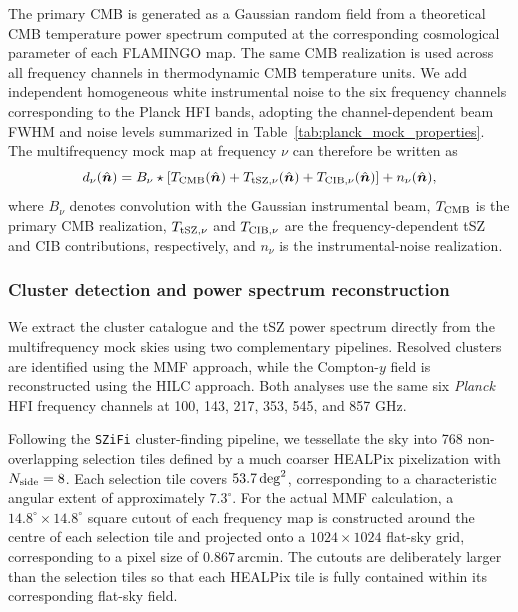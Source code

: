 \documentclass[aps,prd,twocolumn,superscriptaddress,nofootinbib,floatfix]{revtex4-2}
\begin{document}
The primary CMB is generated as a Gaussian random field from a theoretical CMB temperature power spectrum computed at the corresponding cosmological parameter of each FLAMINGO map. The same CMB realization is used across all frequency channels in thermodynamic CMB temperature units. We add independent homogeneous white instrumental noise to the six frequency channels corresponding to the Planck HFI bands, adopting the channel-dependent beam FWHM and noise levels summarized in Table~\ref{tab:planck_mock_properties}. The multifrequency mock map at frequency $\nu$ can therefore be written as
\begin{equation}
d_{\nu}(\hat{\bm n})
=
B_{\nu}\star
\left[
T_{\rm CMB}(\hat{\bm n})
+
T_{{\rm tSZ},\nu}(\hat{\bm n})
+
T_{{\rm CIB},\nu}(\hat{\bm n})
\right]
+
n_{\nu}(\hat{\bm n}),
\label{eq:multifrequency_mock_map}
\end{equation}
where $B_{\nu}$ denotes convolution with the Gaussian instrumental beam, $T_{\rm CMB}$ is the primary CMB realization, $T_{{\rm tSZ},\nu}$ and $T_{{\rm CIB},\nu}$ are the frequency-dependent tSZ and CIB contributions, respectively, and $n_{\nu}$ is the instrumental-noise realization. 

\subsubsection{Cluster detection and power spectrum reconstruction}

We extract the cluster catalogue and the tSZ power spectrum directly from the multifrequency mock skies using two complementary pipelines. Resolved clusters are identified using the MMF approach, while the Compton-$y$ field is reconstructed using the HILC approach. Both analyses use the same six \textit{Planck} HFI frequency channels at 100, 143, 217, 353, 545, and 857 GHz.

Following the \texttt{SZiFi} cluster-finding pipeline, we tessellate the sky into 768 non-overlapping selection tiles defined by a much coarser HEALPix pixelization with $N_{\rm side}=8$. Each selection tile covers $53.7\,{\rm deg}^2$, corresponding to a characteristic angular extent of approximately $7.3^\circ$. For the actual MMF calculation, a $14.8^\circ\times14.8^\circ$ square cutout of each frequency map is constructed around the centre of each selection tile and projected onto a $1024\times1024$ flat-sky grid, corresponding to a pixel size of $0.867\,\mathrm{arcmin}$. The cutouts are deliberately larger than the selection tiles so that each HEALPix tile is fully contained within its corresponding flat-sky field.
\end{document}
